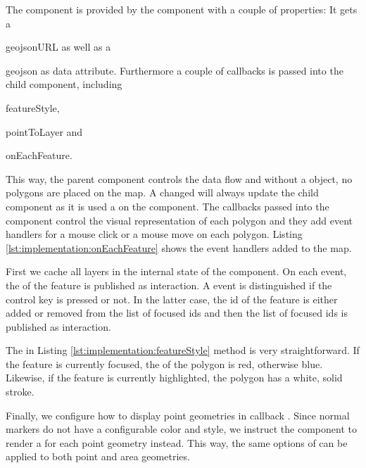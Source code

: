 The  component is provided by the  component with a couple of properties:
It gets a
\begin{enumerate*}[label=(\arabic*)]
  \item
    geojsonURL as well as a
  \item
    geojson as data attribute. Furthermore a couple of callbacks is passed into the child component, including
  \item
    featureStyle,
  \item
    pointToLayer and
  \item
    onEachFeature.
\end{enumerate*}

This way, the parent  component controls the data flow and without a  object, no polygons are placed on the map.
A changed  will always update the child component as it is used a  on the  component.
The callbacks passed into the  component control the visual representation of each polygon and they add event handlers for a mouse click or a mouse move on each polygon.
Listing \ref{lst:implementation:onEachFeature} shows the event handlers added to the map.



First we cache all layers in the internal state of the  component.
On each  event, the  of the feature is published as  interaction.
A  event is distinguished if the control key is pressed or not.
In the latter case, the id of the feature is either added or removed from the list of focused ids and then the list of focused ids is published as  interaction.



The  in Listing \ref{lst:implementation:featureStyle} method is very straightforward.
If the feature is currently focused, the  of the polygon is red, otherwise blue.
Likewise, if the feature is currently highlighted, the polygon has a white, solid stroke.



Finally, we configure how to display point geometries in callback .
Since normal markers do not have a configurable color and style, we instruct the  component to render a  for each point geometry instead.
This way, the same options of  can be applied to both point and area geometries.




